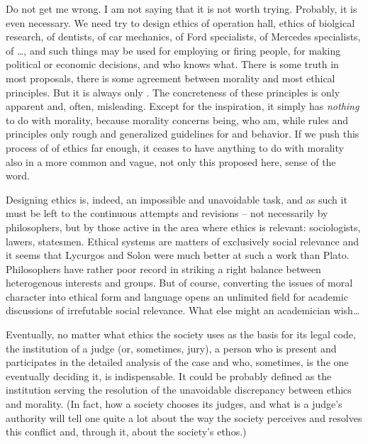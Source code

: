{{{}

\pa Do not get me wrong.  I am not saying that it is not worth trying. 
Probably, it is even necessary.  We need try to design ethics of
operation hall, ethics of biolgical research, of dentists, of car
mechanics, of Ford specialists, of Mercedes specialists, of \ldots ,
and such things may be used for employing or firing people, for making
political or economic decisions, and who knows what.  There is some
truth in most proposals, there is some agreement between morality and
most ethical principles.  But it is always only .  The
concreteness of these principles is only apparent and, often,
misleading.  Except for the  inspiration, it simply has {\em
nothing} to do with morality, because morality concerns  being,
who  am, while rules and principles only rough and generalized
guidelines for  and behavior.  If we push this process of
 of ethics far enough, it ceases to have anything
to do with morality also in a more common and vague, not only this
proposed here, sense of the word.

Designing ethics is, indeed, an impossible and unavoidable task, and as such it
must be left to the continuous attempts and revisions -- not necessarily by
philosophers, but by those active in the area where ethics is relevant:
sociologists, lawers, statesmen.  Ethical systems are matters of exclusively
social relevance and it seems that Lycurgos and Solon were much better at such a
work than Plato.  Philosophers have rather poor record in striking a right
balance between heterogenous interests and groups.  But of course, converting
the issues of moral character into ethical form and language opens an unlimited
field for academic discussions of irrefutable social relevance. What else might
an academician wish\ldots

\pa Eventually, no matter what ethics the society uses as the basis
for its legal code, the institution of a judge (or, sometimes, jury),
a person who is present and participates in the detailed analysis of
the case and who, sometimes, is the one eventually deciding it, is
indispensable.  It could be probably defined as the institution
serving the resolution of the unavoidable discrepancy between ethics
and morality.  (In fact, how a society chooses its judges, and what is
a judge's authority will tell one quite a lot about the way the
society perceives and resolves this conflict and, through it, about
the society's ethos.)

}}
